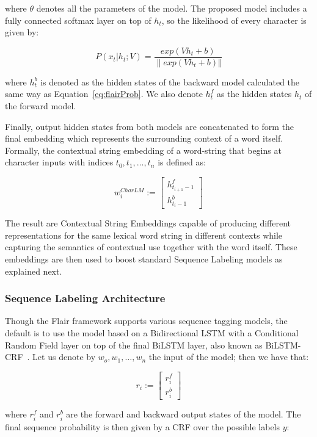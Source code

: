 \noindent where $\theta$ denotes all the parameters of the model. The proposed model includes a fully 
connected softmax layer on top of $h_t$, so the likelihood of every character is given by:

\[
    P(x_t|h_t;V) = \frac{exp(V h_t+b)}{\| exp(V h_t+b) \Vert }
\]

\noindent where $h_t^b$ is denoted as the hidden states of the backward model calculated the same way as 
Equation~\ref{eq:flairProb}. We also denote $h_t^f$ as the hidden states $h_t$ of the forward model. 

Finally, output hidden states from both models are concatenated to form the final embedding 
which represents the surrounding context of a word itself. Formally, the contextual string 
embedding of a word-string that begins at character inputs with indices $t_0,t_1,\ldots,t_n$ 
is defined as:

\[
    w_i^{CharLM} := \begin{bmatrix} h_{t_{i+1}-1}^f \\ h_{t_{i}-1}^b \end{bmatrix}
\]

The result are Contextual String Embeddings capable of producing different representations for 
the same lexical word string in different contexts while capturing the semantics of contextual 
use together with the word itself. These embeddings are then used to boost standard Sequence 
Labeling models as explained next.

\subsubsection{Sequence Labeling Architecture}
\label{cap2:theoFrame/infExtr/sequenceLabeling/architecture}
Though the Flair framework supports various sequence tagging models, the default is to use the 
model based on a Bidirectional LSTM with a Conditional Random Field layer on top of the final 
BiLSTM layer, also known as BiLSTM-CRF~\cite{seqlab:HuangXY15}. Let us denote by $w_o,w_1,\ldots,w_n$ 
the input of the model; then we have that:

\[
    r_i := \begin{bmatrix} r_i^f \\ r_i^b \end{bmatrix}
\]

where $r_i^f$ and $r_i^b$ are the forward and backward output states of the model. The final 
sequence probability is then given by a CRF over the possible labels $y$:

